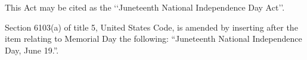 \documentclass[10pt]{article}
\begin{document}
\begin{act}


This Act may be cited as the ‘‘Juneteenth National Independence
Day Act’’.


Section 6103(a) of title 5, United States Code, is amended
by inserting after the item relating to Memorial Day the following:
``Juneteenth National Independence Day, June 19.''.	
	
	
	
	\end{act}

	
\end{document}
